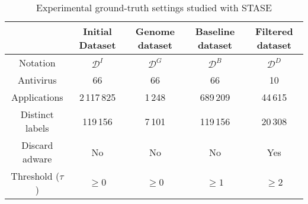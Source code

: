 \begin{table}[!ht]
    \label{table:stase:experimental}
    \caption{Experimental ground-truth settings studied with STASE}
    \begin{tabular}{|c|c|c|c|c|}
    \hline
    & Initial Dataset & Genome dataset & Baseline dataset & Filtered dataset \\ \hline
    Notation & $\mathcal{D}^I$& $\mathcal{D}^G$& $\mathcal{D}^B $& $\mathcal{D}^D$\\%
    Antivirus & 66 & 66 & 66 & 10 \\%
    Applications & 2\,117\,825 & 1\,248	& 689\,209 & 	44\,615 \\%
    Distinct labels & 119\,156 & 7\,101 & 	119\,156 & 	20\,308 \\%
    Discard adware & No & No & No & Yes \\%
    Threshold ($\tau$) & $\geq 0$& $\geq 0$& $\geq 1$& $\geq 2$ \\
    \hline
    \end{tabular}
\end{table}
